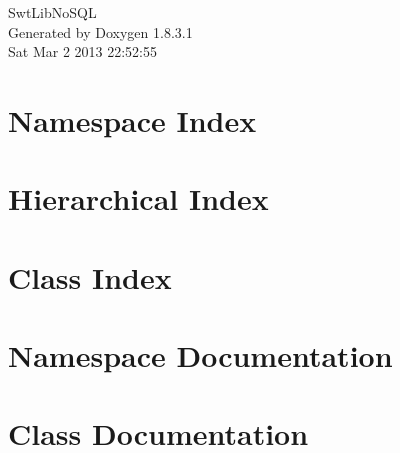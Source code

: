 \documentclass{book}
\begin{document}
\hypersetup{pageanchor=false,citecolor=blue}
\begin{titlepage}
\vspace*{7cm}
\begin{center}
{\Large Swt\-Lib\-No\-S\-Q\-L }\\
\vspace*{1cm}
{\large Generated by Doxygen 1.8.3.1}\\
\vspace*{0.5cm}
{\small Sat Mar 2 2013 22:52:55}\\
\end{center}
\end{titlepage}
\clearemptydoublepage
{}
\tableofcontents
\clearemptydoublepage
{}
\hypersetup{pageanchor=true,citecolor=blue}
\chapter{Namespace Index}

\chapter{Hierarchical Index}

\chapter{Class Index}

\chapter{Namespace Documentation}

\chapter{Class Documentation}







\printindex
\end{document}
